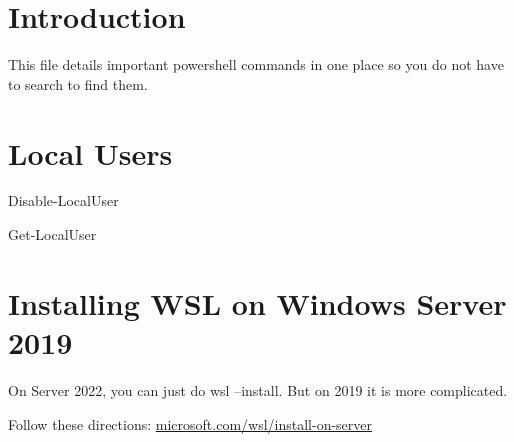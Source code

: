 \documentclass{article}
\begin{document}
\graphicspath{ {./Images/} }
\tableofcontents

\section{Introduction}
This file details important powershell commands in one place so you do not have to search to find them.

\section{Local Users}
Disable-LocalUser

Get-LocalUser

\section{Installing WSL on Windows Server 2019}
On Server 2022, you can just do wsl --install. But on 2019 it is more complicated. 

Follow these directions: \href{https://learn.microsoft.com/en-us/windows/wsl/install-on-server}{microsoft.com/wsl/install-on-server}
\end{document}
